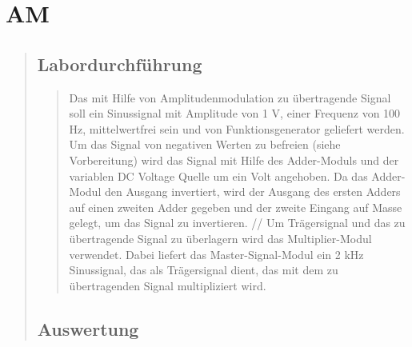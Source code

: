 \section{AM}
\begin{quote}
    
    
    \subsection{Labordurchführung}
    \begin{quote}
      Das mit Hilfe von Amplitudenmodulation zu übertragende Signal soll ein
      Sinussignal mit Amplitude von 1 V, einer Frequenz von 100 Hz, 
      mittelwertfrei sein und von Funktionsgenerator geliefert werden.
      Um das Signal von negativen Werten zu befreien (siehe Vorbereitung) wird
      das Signal mit Hilfe des Adder-Moduls und der variablen DC Voltage Quelle
      um ein Volt angehoben. Da das Adder-Modul den Ausgang invertiert, wird der
      Ausgang des ersten Adders auf einen zweiten Adder gegeben und der zweite
      Eingang auf Masse gelegt, um das Signal zu invertieren. //
      Um Trägersignal und das zu übertragende Signal zu überlagern wird das
      Multiplier-Modul verwendet. Dabei liefert das Master-Signal-Modul ein 2
      kHz Sinussignal, das als Trägersignal dient, das mit dem zu übertragenden
      Signal multipliziert wird.
        
    \end{quote}

    
    
    
    
    
    \subsection{Auswertung}
    \begin{quote}
        
        
        
    \end{quote}
    
\end{quote}


